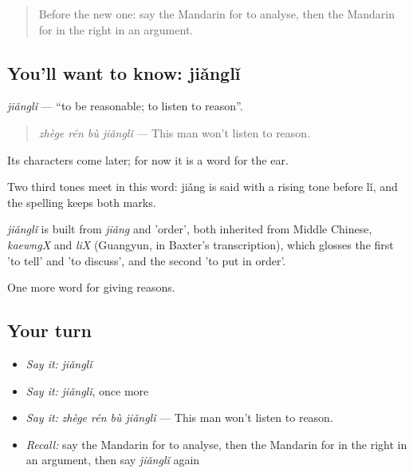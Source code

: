 \label{lesson:ZH-C351-jiangli}



\begin{quote}
Before the new one: say the Mandarin for to analyse, then the Mandarin for in the right in an argument.
\end{quote}

\subsection*{You'll want to know: jiǎnglǐ}
\emph{jiǎnglǐ} — \textquotedblleft{}to be reasonable; to listen to reason\textquotedblright{}.

\begin{quote}
\emph{zhège rén bù jiǎnglǐ} — This man won't listen to reason.
\end{quote}

Its characters come later; for now it is a word for the ear.

Two third tones meet in this word: jiǎng is said with a rising tone before lǐ, and the spelling keeps both marks.

\begin{cousinweb}
\emph{jiǎnglǐ} is built from \emph{jiǎng} and  'order', both inherited from Middle Chinese, \emph{kaewngX} and \emph{liX} (Guangyun, in Baxter's transcription), which glosses the first 'to tell' and 'to discuss', and the second 'to put in order'.
\end{cousinweb}

\begin{grammarlens}[title={What you've built}]
One more word for giving reasons.
\end{grammarlens}

\subsection*{Your turn}
\begin{itemize}
\raggedright
  \item \emph{Say it:} \emph{jiǎnglǐ}
  \item \emph{Say it:} \emph{jiǎnglǐ}, once more
  \item \emph{Say it:} \emph{zhège rén bù jiǎnglǐ} — This man won't listen to reason.
  \item \emph{Recall:} say the Mandarin for to analyse, then the Mandarin for in the right in an argument, then say \emph{jiǎnglǐ} again
\end{itemize}

